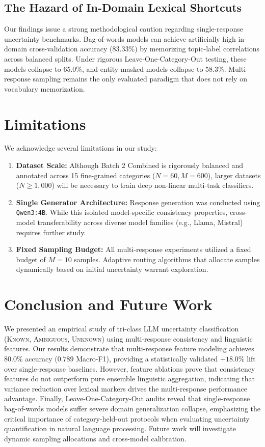 \documentclass[conference]{IEEEtran}
\begin{document}
\subsection{The Hazard of In-Domain Lexical Shortcuts}
Our findings issue a strong methodological caution regarding single-response uncertainty benchmarks. Bag-of-words models can achieve artificially high in-domain cross-validation accuracy ($83.33\%$) by memorizing topic-label correlations across balanced splits. Under rigorous Leave-One-Category-Out testing, these models collapse to $65.0\%$, and entity-masked models collapse to $58.3\%$. Multi-response sampling remains the only evaluated paradigm that does not rely on vocabulary memorization.

\section{Limitations}

We acknowledge several limitations in our study:
\begin{enumerate}
    \item \textbf{Dataset Scale:} Although Batch 2 Combined is rigorously balanced and annotated across 15 fine-grained categories ($N=60, M=600$), larger datasets ($N \ge 1,000$) will be necessary to train deep non-linear multi-task classifiers.
    \item \textbf{Single Generator Architecture:} Response generation was conducted using \texttt{Qwen3:4B}. While this isolated model-specific consistency properties, cross-model transferability across diverse model families (e.g., Llama, Mistral) requires further study.
    \item \textbf{Fixed Sampling Budget:} All multi-response experiments utilized a fixed budget of $M=10$ samples. Adaptive routing algorithms that allocate samples dynamically based on initial uncertainty warrant exploration.
\end{enumerate}

\section{Conclusion and Future Work}

We presented an empirical study of tri-class LLM uncertainty classification (\textsc{Known}, \textsc{Ambiguous}, \textsc{Unknown}) using multi-response consistency and linguistic features. Our results demonstrate that multi-response feature modeling achieves $80.0\%$ accuracy ($0.789$ Macro-F1), providing a statistically validated $+18.0\%$ lift over single-response baselines. However, feature ablations prove that consistency features do not outperform pure ensemble linguistic aggregation, indicating that variance reduction over lexical markers drives the multi-response performance advantage. Finally, Leave-One-Category-Out audits reveal that single-response bag-of-words models suffer severe domain generalization collapse, emphasizing the critical importance of category-held-out protocols when evaluating uncertainty quantification in natural language processing. Future work will investigate dynamic sampling allocations and cross-model calibration.



\end{document}
